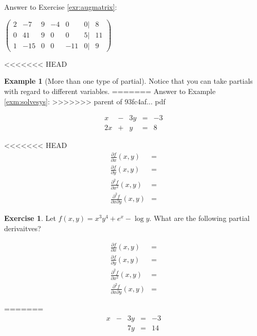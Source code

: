 \documentclass[]{book}
\theoremstyle{definition}
\theoremstyle{definition}
\newtheorem{example}{Example}[chapter]
\theoremstyle{definition}
\newtheorem{exercise}{Exercise}[chapter]
\theoremstyle{remark}
\begin{document}
Answer to Exercise \ref{exr:augmatrix}:

\(\begin{pmatrix}  2 & -7 & 9 & -4 & 0 & 0| & 8\\  0 & 41 & 9 & 0 & 0 & 5 | & 11\\  1 & -15 & 0 & 0 & -11 & 0 | & 9  \end{pmatrix}\)

<<<<<<< HEAD
\begin{example}[More than one type of partial]
\protect\hypertarget{exm:unnamed-chunk-18}{}{\label{exm:unnamed-chunk-18} {} }Notice that you can take partials with regard to different variables.
=======
Answer to Example \ref{exm:solvesys}:
>>>>>>> parent of 93fc4af... pdf

\[\begin{matrix}
            x  & - & 3y & = & -3\\
            2x & + &  y & = &  8
            \end{matrix}\]

<<<<<<< HEAD
\begin{align*}
\frac{\partial f}{\partial x}(x,y) &=\\
\frac{\partial f}{\partial y}(x,y) &=\\
\frac{\partial^2 f}{\partial x^2}(x,y) &=\\
\frac{\partial^2 f}{\partial x \partial y}(x,y) &=
\end{align*}
\end{example}

\begin{exercise}
\protect\hypertarget{exr:unnamed-chunk-19}{}{\label{exr:unnamed-chunk-19} }Let \(f(x,y)=x^3 y^4 +e^x -\log y\). What are the following partial derivaitves?

\begin{align*}
\frac{\partial f}{\partial x}(x,y) &=\\
\frac{\partial f}{\partial y}(x,y) &=\\
\frac{\partial^2 f}{\partial x^2}(x,y) &=\\
\frac{\partial^2 f}{\partial x \partial y}(x,y) &= 
\end{align*}
\end{exercise}
=======
\[\begin{matrix}
            x  & - & 3y & = & -3\\
               &   & 7y & = & 14\\          
            \end{matrix}\]
\end{document}
